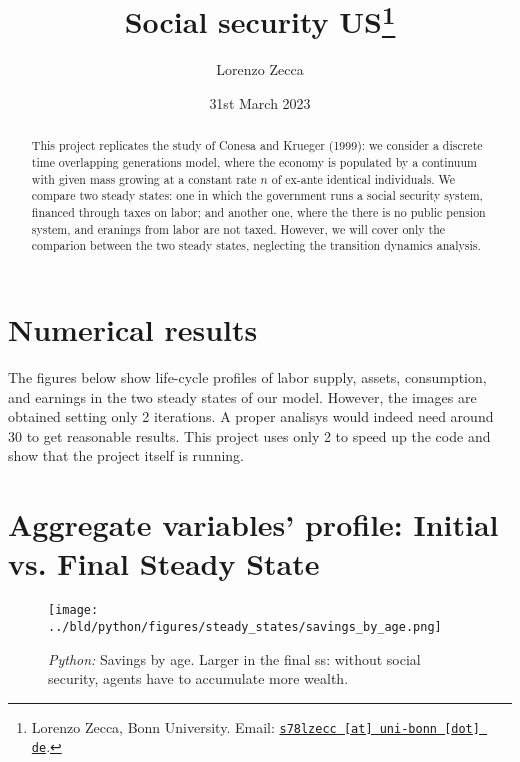 \documentclass[11pt, a4paper, leqno]{article}
\begin{document}
\title{Social security US\thanks{Lorenzo Zecca, Bonn University. Email: \href{mailto:s78lzecc@uni-bonn.de}{\nolinkurl{s78lzecc [at] uni-bonn [dot] de}}.}}

\author{Lorenzo Zecca}

\date{
    31st March 2023
}

\maketitle


\begin{abstract}
    This project replicates the study of Conesa and Krueger (1999): we consider a discrete time overlapping generations model, 
    where the economy is populated by a continuum with given mass 
    growing at a constant rate $n$ of ex-ante identical individuals.
    We compare two steady states: 
    one in which the government runs a social security system, financed 
    through taxes on labor; and another one, where the there is no public 
    pension system, and eranings from labor are not taxed. However, we will cover only 
    the comparion between the two steady states, neglecting the transition dynamics analysis.
\end{abstract}

\clearpage


\section{Numerical results} %
The figures below show life-cycle profiles of labor supply, assets, consumption, and earnings in the two steady states of
our model. However, the images are obtained setting only 2 iterations. A proper analisys would indeed need around 30 to get reasonable results.
This project uses only 2 to speed up the code and show that the project itself is running.

\begin{table}[!htb]

\end{table}
\section{Aggregate variables' profile: Initial vs. Final Steady State}

\begin{figure}

    \centering
    \texttt{[image: ../bld/python/figures/steady\_states/savings\_by\_age.png]}
    \caption{\emph{Python:} Savings by age. Larger in the final ss: without social security, agents have to accumulate more wealth.}
    \label{fig:python-K}
\end{figure}
\end{document}
